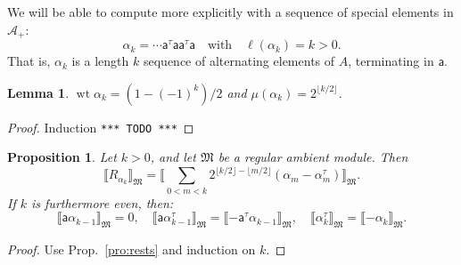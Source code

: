 \documentclass{article}
\def\MISS{\texttt{*** TODO ***}}
\def\llb{\llbracket}
\def\rrb{\rrbracket}
\def\fM{\mathfrak{M}}
\def\sA{\mathscr{A}}
\def\inv{\tau} %
\DeclareMathOperator{\wt}{\mathrm{wt}}
\def\a{\mathsf{a}}
\def\R{R}
\newtheorem{lem}{Lemma}
\newtheorem{prop}{Proposition}
\theoremstyle{definition}
\begin{document}
We will be able to compute more explicitly with a sequence of special elements in $\sA_+$:
$$ \alpha_k = \cdots \a^\inv \a \a^\inv\a\quad\textrm{with}\quad \ell(\alpha_k)=k > 0. $$
That is, $\alpha_k$ is a length $k$ sequence of alternating elements of $A$,
terminating in $\a$.
\begin{lem}
        $\wt\alpha_k = (1 - (-1)^k)/2$ and $\mu(\alpha_k) = 2^{\lfloor k/2\rfloor}$.
\end{lem}
\begin{proof}Induction \MISS \end{proof}
\begin{prop}
        Let $k>0$, and let $\fM$ be a regular ambient module.
        Then
        $$
         \llb \R_{\alpha_k}\rrb_\fM = \llb \sum_{0<m<k} 2^{\lfloor k/2\rfloor - \lfloor m/2\rfloor} (\alpha_m
         - \alpha_m^\inv) \rrb_\fM.
        $$
        If $k$ is furthermore even, then:
        $$\llb \a \alpha_{k-1}\rrb_\fM=0,\quad
        \llb \a \alpha_{k-1}^\inv \rrb_\fM = \llb -\a^\inv \alpha_{k-1}\rrb_\fM,\quad
        \llb \alpha_k^\inv\rrb_\fM = \llb -\alpha_k\rrb_\fM.$$
\end{prop}
\begin{proof}
        Use Prop.~\ref{pro:rests} and induction on $k$.
\end{proof}
\end{document}
